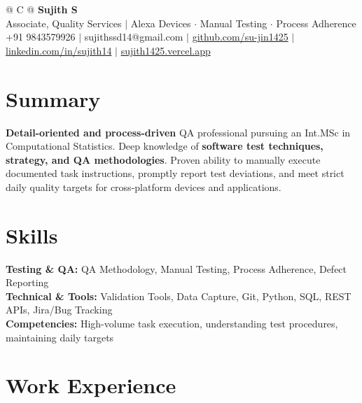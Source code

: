 \documentclass[a4paper,11pt]{article}
\newcommand{\ulink}[2]{\href{#1}{#2}}
\begin{document}
\pagestyle{empty}

\begin{tabularx}{\linewidth}{@{} C @{}}
{\color[HTML]{000000}\fontsize{30}{35}\selectfont\bfseries Sujith S} \\[5pt]
{\fontsize{10.5}{12.5}\selectfont\color[HTML]{3A3A3A}
Associate, Quality Services $|$ Alexa Devices $\cdot$ Manual Testing $\cdot$ Process Adherence} \\[6pt]
{\fontsize{9.5}{11.5}\selectfont\textcolor[HTML]{3A3A3A}{+91 9843579926 $|$ sujithssd14@gmail.com $|$ \ulink{https://github.com/su-jin1425}{github.com/su-jin1425} $|$ \ulink{https://linkedin.com/in/sujith14}{linkedin.com/in/sujith14} $|$ \ulink{https://sujith1425.vercel.app}{sujith1425.vercel.app}}}
\end{tabularx}

\section{Summary}
\vspace{2pt}

{\color[HTML]{0A0A0A}\fontsize{11}{14}\selectfont
\textbf{Detail-oriented and process-driven} QA professional pursuing an Int.MSc in Computational Statistics. Deep knowledge of \textbf{software test techniques, strategy, and QA methodologies}. Proven ability to manually execute documented task instructions, promptly report test deviations, and meet strict daily quality targets for cross-platform devices and applications.}

\section{Skills}
\vspace{2pt}

{\color[HTML]{0A0A0A}\fontsize{11}{14}\selectfont
\textbf{Testing \& QA:} QA Methodology, Manual Testing, Process Adherence, Defect Reporting \\[2pt]
\textbf{Technical \& Tools:} Validation Tools, Data Capture, Git, Python, SQL, REST APIs, Jira/Bug Tracking \\[2pt]
\textbf{Competencies:} High-volume task execution, understanding test procedures, maintaining daily targets}

\section{Work Experience}
\vspace{2pt}
\end{document}
